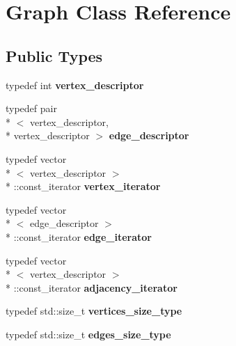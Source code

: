 \hypertarget{classGraph}{\section{Graph Class Reference}
\label{classGraph}
}
\subsection*{Public Types}
\begin{DoxyCompactItemize}
\item 
\hypertarget{classGraph_adeba8286db7d42e6ffac2554b314d61d}{typedef int {\bfseries vertex\-\_\-descriptor}}\label{classGraph_adeba8286db7d42e6ffac2554b314d61d}

\item 
\hypertarget{classGraph_a89cc13886360aec5e3f4e2e147d2ba75}{typedef pair\\*
$<$ vertex\-\_\-descriptor, \\*
vertex\-\_\-descriptor $>$ {\bfseries edge\-\_\-descriptor}}\label{classGraph_a89cc13886360aec5e3f4e2e147d2ba75}

\item 
\hypertarget{classGraph_afa665772cf14aa92e744a8d99f37a771}{typedef vector\\*
$<$ vertex\-\_\-descriptor $>$\\*
\-::const\-\_\-iterator {\bfseries vertex\-\_\-iterator}}\label{classGraph_afa665772cf14aa92e744a8d99f37a771}

\item 
\hypertarget{classGraph_a32364c30bac225a0f7a70b92ee396737}{typedef vector\\*
$<$ edge\-\_\-descriptor $>$\\*
\-::const\-\_\-iterator {\bfseries edge\-\_\-iterator}}\label{classGraph_a32364c30bac225a0f7a70b92ee396737}

\item 
\hypertarget{classGraph_a921bd77ab8c9e103b47cc8916320a1bb}{typedef vector\\*
$<$ vertex\-\_\-descriptor $>$\\*
\-::const\-\_\-iterator {\bfseries adjacency\-\_\-iterator}}\label{classGraph_a921bd77ab8c9e103b47cc8916320a1bb}

\item 
\hypertarget{classGraph_ac1e19ecbf236d08dff611584e4c9403e}{typedef std\-::size\-\_\-t {\bfseries vertices\-\_\-size\-\_\-type}}\label{classGraph_ac1e19ecbf236d08dff611584e4c9403e}

\item 
\hypertarget{classGraph_a1924745b438f862ba9aa7cd0ff5b7da5}{typedef std\-::size\-\_\-t {\bfseries edges\-\_\-size\-\_\-type}}\label{classGraph_a1924745b438f862ba9aa7cd0ff5b7da5}

\end{DoxyCompactItemize}
